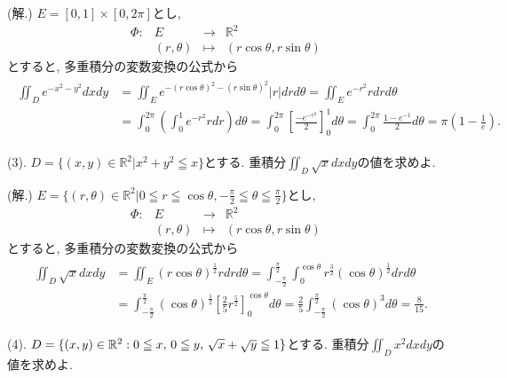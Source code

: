 \documentclass[dvipdfmx,a4paper,11pt]{article}
\newcommand{\R}{\mathbb{R}}
\theoremstyle{definition}
\begin{document}
\hspace{-11pt}(解.) 
$E=[0,1]\times[0,2\pi]$とし, 
 $$
\begin{array}{ccccc}
\Phi: &E & \rightarrow & \R^2 & \\
&(r,\theta) & \longmapsto & (r \cos \theta , r \sin \theta)&
\end{array}
$$
とすると, 多重積分の変数変換の公式から
\begin{align*}
\begin{split}
\iint_{D} e^{-x^2-y^2}dxdy
&=
\iint_{E} e^{-(r \cos \theta )^2- (r \sin \theta )^2} |r|drd\theta =
\iint_{E} e^{-r^2}r drd\theta \\
&=
\int_{0}^{2\pi} \left( \int_{0}^{1}e^{-r^2}r dr\right)d\theta 
=\int_{0}^{2\pi} \left[ \frac{-e^{-r^2}}{2} \right]_{0}^{1} d\theta 
=\int_{0}^{2\pi} \frac{1-e^{-1}}{2} d\theta =\pi\left( 1-\frac{1}{e}\right).
    \end{split}
  \end{align*}
  

{\large(3). $D=\{ (x,y) \in \R^2 | x^2 + y^2 \leqq x\}$とする.
重積分$\iint_{D} \sqrt{x}dxdy$の値を求めよ.}

\hspace{-11pt}(解.) $E= \{ (r ,\theta) \in \R^2  | 0 \leqq r \leqq \cos \theta, 
 -\frac{\pi}{2}\leqq \theta  \leqq\frac{\pi}{2}\}$とし, 
 $$
\begin{array}{ccccc}
\Phi: &E & \rightarrow & \R^2 & \\
&(r,\theta) & \longmapsto & (r \cos \theta , r \sin \theta)&
\end{array}
$$
とすると, 多重積分の変数変換の公式から
\begin{align*}
\begin{split}
\iint_{D} \sqrt{x}dxdy
&=
\iint_{E}  (r\cos \theta)^{\frac{1}{2}} rdrd\theta 
= \int_{- \frac{\pi}{2}}^{\frac{\pi}{2}} 
 \int_{0}^{\cos \theta} r^{\frac{3}{2}} (\cos \theta)^{\frac{1}{2}} drd\theta \\
&=
\int_{- \frac{\pi}{2}}^{\frac{\pi}{2}} (\cos \theta)^{\frac{1}{2}} 
 \left[ \frac{2}{5}r^{\frac{5}{2}} \right]_{0}^{\cos \theta} d\theta 
=\frac{2}{5} \int_{- \frac{\pi}{2}}^{\frac{\pi}{2}} (\cos \theta)^{3} d\theta 
=\frac{8}{15}.
    \end{split}
  \end{align*}


{\large(4). $D=\{ (x,y) \in \R^2 : 0 \leqq x, \text{\,}  0 \leqq y,\text{\,} \sqrt{x} + \sqrt{y} \leqq 1\}$とする.
重積分$\iint_{D} x^2dxdy$の値を求めよ.}
\end{document}
